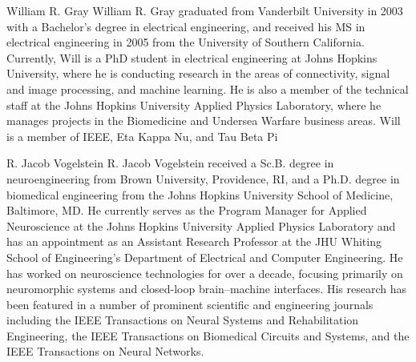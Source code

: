 \documentclass[10pt,journal,cspaper,compsoc]{IEEEtran}
\begin{document}
\begin{IEEEbiography}
{William R. Gray}
William R. Gray graduated from Vanderbilt University in 2003 with a Bachelor’s degree in electrical engineering, and received his MS in electrical engineering in 2005 from the University of Southern California.  Currently, Will is a PhD student in electrical engineering at Johns Hopkins University, where he is conducting research in the areas of connectivity, signal and image processing, and machine learning.  He is also a member of the technical staff at the Johns Hopkins University Applied Physics Laboratory, where he manages projects in the Biomedicine and Undersea Warfare business areas.  Will is a member of IEEE, Eta Kappa Nu, and Tau Beta Pi
\end{IEEEbiography}


\begin{IEEEbiography}
{R. Jacob Vogelstein}
R. Jacob Vogelstein received a Sc.B. degree in neuroengineering from Brown University, Providence, RI, and a Ph.D. degree in biomedical engineering from the Johns Hopkins University School of Medicine, Baltimore, MD.  He currently serves as the Program Manager for Applied Neuroscience at the Johns Hopkins University Applied Physics Laboratory and has an appointment as an Assistant Research Professor at the JHU Whiting School of Engineering’s Department of Electrical and Computer Engineering. He has worked on neuroscience technologies for over a decade, focusing primarily on neuromorphic systems and closed-loop brain–machine interfaces. His research has been featured in a number of prominent scientific and engineering journals including the IEEE Transactions on Neural Systems and Rehabilitation Engineering, the IEEE Transactions on Biomedical Circuits and Systems, and the IEEE Transactions on Neural Networks.  
\end{IEEEbiography}
\end{document}
